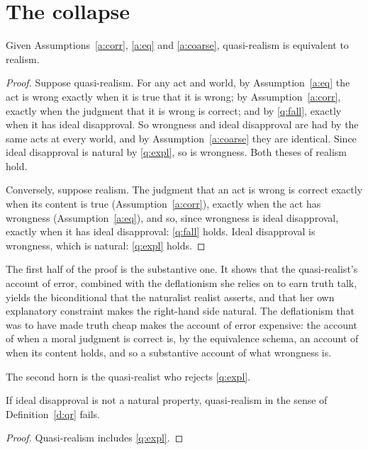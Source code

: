 \documentclass{situationist-preprint}
\begin{document}
\section{The collapse}\label{s:theorem}

\begin{theorem}\label{t:collapse}
Given Assumptions~\ref{a:corr}, \ref{a:eq} and \ref{a:coarse}, quasi-realism is equivalent to realism.
\end{theorem}

\begin{proof}
Suppose quasi-realism. For any act and world, by Assumption~\ref{a:eq} the act is wrong exactly when it is true that it is wrong; by Assumption~\ref{a:corr}, exactly when the judgment that it is wrong is correct; and by \ref{q:fall}, exactly when it has ideal disapproval. So wrongness and ideal disapproval are had by the same acts at every world, and by Assumption~\ref{a:coarse} they are identical. Since ideal disapproval is natural by \ref{q:expl}, so is wrongness. Both theses of realism hold.

Conversely, suppose realism. The judgment that an act is wrong is correct exactly when its content is true (Assumption~\ref{a:corr}), exactly when the act has wrongness (Assumption~\ref{a:eq}), and so, since wrongness is ideal disapproval, exactly when it has ideal disapproval: \ref{q:fall} holds. Ideal disapproval is wrongness, which is natural: \ref{q:expl} holds.
\end{proof}

The first half of the proof is the substantive one. It shows that the quasi-realist's account of error, combined with the deflationism she relies on to earn truth talk, yields the biconditional that the naturalist realist asserts, and that her own explanatory constraint makes the right-hand side natural. The deflationism that was to have made truth cheap makes the account of error expensive: the account of when a moral judgment is correct is, by the equivalence schema, an account of when its content holds, and so a substantive account of what wrongness is.

The second horn is the quasi-realist who rejects \ref{q:expl}.

\begin{proposition}\label{p:moral}
If ideal disapproval is not a natural property, quasi-realism in the sense of Definition~\ref{d:qr} fails.
\end{proposition}

\begin{proof}
Quasi-realism includes \ref{q:expl}.
\end{proof}
\end{document}
